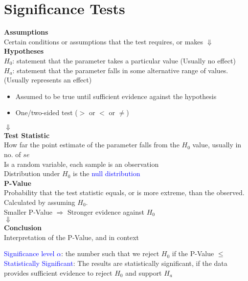 \section{Significance Tests}
\begin{center}
\textbf{Assumptions}\\
Certain conditions or assumptions that the test requires, or makes
$\Downarrow$\\
\textbf{Hypotheses}\\
$H_0$: statement that the parameter takes a particular value (Usually no effect)\\
$H_a$: statement that the parameter falls in some alternative range of values. (Usually represents an effect)\\
\begin{itemize}
	\item Assumed to be true until sufficient evidence against the hypothesis
	\item One/two-sided test ($>$ or $<$ or $\neq$)
\end{itemize}
$\Downarrow$\\
\textbf{Test Statistic}\\
How far the point estimate of the parameter falls from the $H_0$ value, usually in no. of $se$\\
Is a random variable, each sample is an observation\\
Distribution under $H_0$ is the \textcolor{Blue}{null distribution}\\
\textbf{P-Value}\\
Probability that the test statistic equals, or is more extreme, than the observed. Calculated by assuming $H_0$.\\
Smaller P-Value $\Rightarrow$ Stronger evidence against $H_0$\\
$\Downarrow$\\
\textbf{Conclusion}\\
Interpretation of the P-Value, and in context
\end{center}
\textcolor{Blue}{Significance level $\alpha$}: the number such that we reject $H_0$ if the P-Value $\le$\\
\textcolor{Blue}{Statistically Significant}: The results are statistically significant, if the data provides sufficient evidence to reject $H_0$ and support $H_a$
